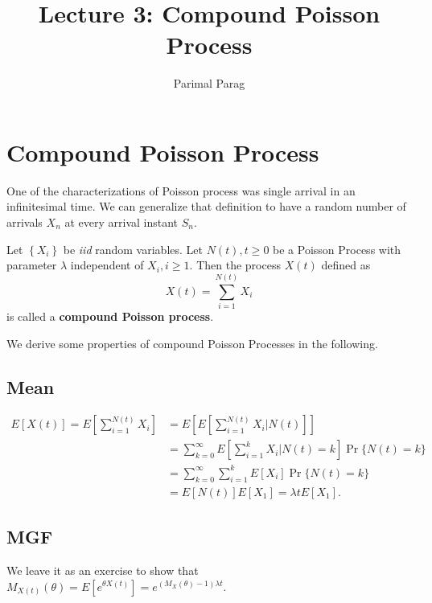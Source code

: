 \documentclass[a4paper,10pt]{article}
\title{Lecture 3:  Compound Poisson Process}
\author{Parimal Parag}
\begin{document}
\maketitle

\section{Compound Poisson Process}
One of the characterizations of Poisson process was single arrival in an infinitesimal time. We can generalize that definition to have a random number of arrivals $X_n$ at every arrival instant $S_n$.
\begin{defn} Let $\left\{X_i\right\}$ be \emph{iid} random variables. Let $N(t), t\geq 0$ be a Poisson Process with parameter $\lambda$ independent of $X_i, i\geq 1$. Then the process $X(t)$ defined as
\begin{equation*}
X(t) = \sum_{i=1}^{N(t)} X_i
\end{equation*}
is called a \textbf{compound Poisson process}.
\end{defn}
We derive some properties of compound Poisson Processes in the following.
\subsection{Mean}
\begin{align*}
E[X(t)] = E[\sum_{i=1}^{N(t)} X_i] &= E[E[\sum_{i=1}^{N(t)} X_i|N(t)]] \\
&= \sum_{k=0}^\infty E\left[\sum_{i=1}^{k} X_i|N(t)=k\right]\Pr\{N(t) = k\}\\
&= \sum_{k=0}^\infty \sum_{i=1}^{k} E[X_i]\Pr\{N(t) = k\}\\
&= E[N(t)]E[X_1] = \lambda tE[X_1].
\end{align*}

\subsection{MGF}
We leave it as an exercise to show that $M_{X(t)}(\theta)=E[e^{\theta X(t)}] = e^{(M_X(\theta)-1)\lambda t}$.
\end{document}
